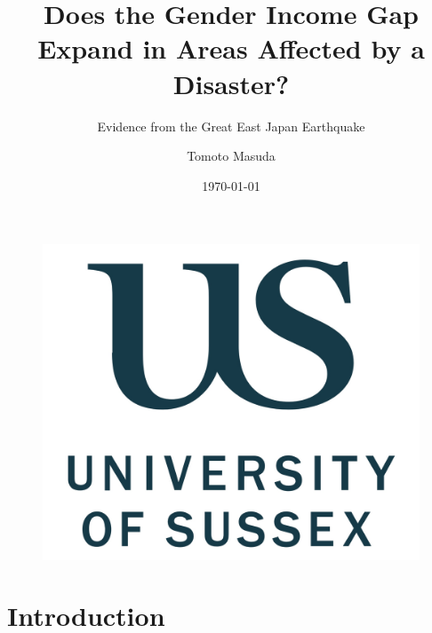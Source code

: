 \documentclass[serif, aspectratio=169]{beamer}
\author{Tomoto Masuda}
\title{Does the Gender Income Gap Expand in Areas Affected by a Disaster?}
\subtitle{Evidence from the Great East Japan Earthquake}
\institute{
    Department of Economics, Business School \\
    University of Sussex
}
\date{\small \today}
\begin{document}
\begin{frame}
    \titlepage
    \vspace*{-0.6cm}
    \begin{figure}[htpb]
        \begin{center}
            \includegraphics[keepaspectratio, scale=0.03]{logo_UoS.jpeg}
        \end{center}
    \end{figure}
\end{frame}

\begin{frame}    
\tableofcontents[sectionstyle=show,
subsectionstyle=show/shaded/hide,
subsubsectionstyle=show/shaded/hide]
\end{frame}

\section{Introduction}
\end{document}
